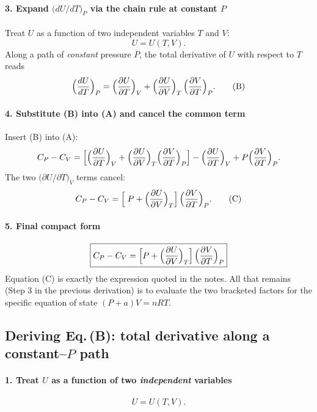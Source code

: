 \documentclass[12pt]{article}
\theoremstyle{definition} %
\theoremstyle{plain} %
\begin{document}
\paragraph{3.  Expand \(\bigl(dU/dT\bigr)_{P}\) via the chain rule at constant \(P\)}
Treat \(U\) as a function of two independent variables \(T\) and \(V\):
\[
U = U(T,V).
\]
Along a path of \emph{constant} pressure \(P\), the total derivative of \(U\) with respect to \(T\) reads
\[
\Bigl(\frac{dU}{dT}\Bigr)_{P}
  = \Bigl(\frac{\partial U}{\partial T}\Bigr)_{V}
  + \Bigl(\frac{\partial U}{\partial V}\Bigr)_{T}\,
    \Bigl(\frac{\partial V}{\partial T}\Bigr)_{P}.
\tag{B}
\]

\paragraph{4.  Substitute (B) into (A) and cancel the common term}
Insert (B) into (A):
\[
C_P-C_V
  = \Bigl[\Bigl(\frac{\partial U}{\partial T}\Bigr)_{V}
          + \Bigl(\frac{\partial U}{\partial V}\Bigr)_{T}
            \Bigl(\frac{\partial V}{\partial T}\Bigr)_{P}\Bigr]
    - \Bigl(\frac{\partial U}{\partial T}\Bigr)_{V}
    + P\Bigl(\frac{\partial V}{\partial T}\Bigr)_{P}.
\]
The two \(\bigl(\partial U/\partial T\bigr)_{V}\) terms cancel:
\[
C_P-C_V
  = \Bigl[\;
      P
      + \Bigl(\frac{\partial U}{\partial V}\Bigr)_{T}\Bigr]\,
    \Bigl(\frac{\partial V}{\partial T}\Bigr)_{P}.
\tag{C}
\]

\paragraph{5.  Final compact form}
\[
\boxed{%
C_P - C_V
  = \Bigl[
      P
      + \Bigl(\frac{\partial U}{\partial V}\Bigr)_{T}\Bigr]\,
    \Bigl(\frac{\partial V}{\partial T}\Bigr)_{P}}
\]
Equation (C) is exactly the expression quoted in the notes.  All that remains (Step 3 in the previous derivation) is to evaluate the two bracketed factors for the specific equation of state \( (P+a)V=nRT \).
\subsection*{Deriving Eq.\,(B): total derivative along a constant–\(P\) path}

\paragraph{1.  Treat \(U\) as a function of two \emph{independent} variables}
\[
U = U(T,V).
\]
\end{document}

